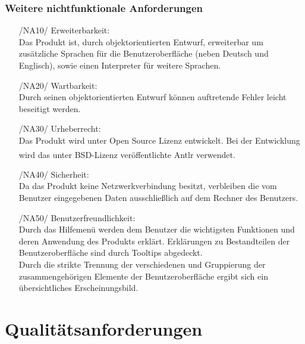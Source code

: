 \documentclass[parskip=full]{scrartcl}
\begin{document}
		\subsubsection{Weitere nichtfunktionale Anforderungen}
		\begin{itemize}
		\item[/NA10/]Erweiterbarkeit: \\
		Das Produkt ist, durch objektorientierten Entwurf, erweiterbar um zusätzliche Sprachen für die Benutzeroberfläche (neben Deutsch und Englisch), sowie einen Interpreter für weitere Sprachen.
		\item[/NA20/]Wartbarkeit: \\
		Durch seinen objektorientierten Entwurf können auftretende Fehler leicht beseitigt werden.
		\item[/NA30/]Urheberrecht: \\
		Das Produkt wird unter Open Source Lizenz entwickelt. Bei der Entwicklung wird das unter BSD-Lizenz veröffentlichte Antlr\textsuperscript{\textcopyright} verwendet.
		\item[/NA40/] Sicherheit: \\
		Da das Produkt keine Netzwerkverbindung besitzt, verbleiben die vom Benutzer eingegebenen Daten ausschließlich auf dem Rechner des Benutzers.
		\item[/NA50/]Benutzerfreundlichkeit: \\
		Durch das Hilfemenü werden dem Benutzer die wichtigsten Funktionen und deren Anwendung des Produkts erklärt. Erklärungen zu Bestandteilen der Benutzeroberfläche sind durch \glspl{Tooltip} abgedeckt. \\
		Durch die strikte Trennung der verschiedenen und Gruppierung der zusammengehörigen Elemente der Benutzeroberfläche ergibt sich ein übersichtliches Erscheinungsbild. 
		\end{itemize}
		

\section{Qualitätsanforderungen}
\end{document}
